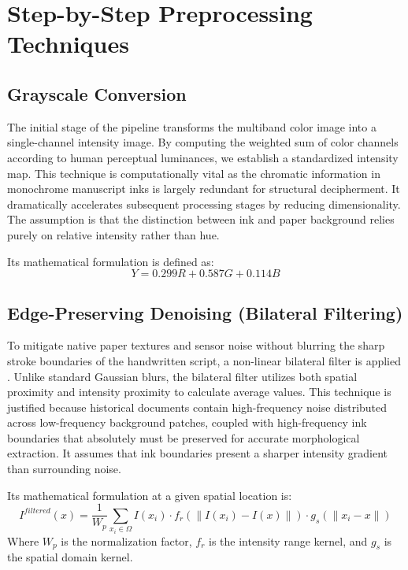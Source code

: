 \documentclass[journal, onecolumn]{IEEEtran}
\begin{document}
\section{Step-by-Step Preprocessing Techniques}

\subsection{Grayscale Conversion}
The initial stage of the pipeline transforms the multiband color image into a single-channel intensity image. By computing the weighted sum of color channels according to human perceptual luminances, we establish a standardized intensity map. This technique is computationally vital as the chromatic information in monochrome manuscript inks is largely redundant for structural decipherment. It dramatically accelerates subsequent processing stages by reducing dimensionality. The assumption is that the distinction between ink and paper background relies purely on relative intensity rather than hue.

Its mathematical formulation is defined as:
\begin{equation}
Y = 0.299R + 0.587G + 0.114B
\end{equation}

\subsection{Edge-Preserving Denoising (Bilateral Filtering)}
To mitigate native paper textures and sensor noise without blurring the sharp stroke boundaries of the handwritten script, a non-linear bilateral filter is applied \cite{tomasi1998}. Unlike standard Gaussian blurs, the bilateral filter utilizes both spatial proximity and intensity proximity to calculate average values. This technique is justified because historical documents contain high-frequency noise distributed across low-frequency background patches, coupled with high-frequency ink boundaries that absolutely must be preserved for accurate morphological extraction. It assumes that ink boundaries present a sharper intensity gradient than surrounding noise.

Its mathematical formulation at a given spatial location is:
\begin{equation}
I^{filtered}(x) = \frac{1}{W_p} \sum_{x_i \in \Omega} I(x_i) \cdot f_r(\|I(x_i) - I(x)\|) \cdot g_s(\|x_i - x\|)
\end{equation}
Where $W_p$ is the normalization factor, $f_r$ is the intensity range kernel, and $g_s$ is the spatial domain kernel.
\end{document}
